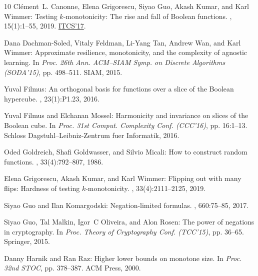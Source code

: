 \documentclass[11pt]{article}
\numberwithin{equation}{section}
\theoremstyle{definition}
\theoremstyle{plain}
\begin{document}
\begin{thebibliography}{10}
{\sc Cl{\'{e}}ment~L. Canonne, Elena Grigorescu, Siyao Guo, Akash Kumar, and
  Karl Wimmer}: Testing $k$-monotonicity: {T}he rise and fall of {B}oolean
  functions.
, 15(1):1--55, 2019.
\newblock \prelim \href{https://doi.org/10.4230/LIPIcs.ITCS.2017.29}{ITCS'17}.

{\sc Dana Dachman-Soled, Vitaly Feldman, Li-Yang Tan, Andrew Wan, and Karl
  Wimmer}: Approximate resilience, monotonicity, and the complexity of agnostic
  learning.
\newblock In {\em Proc. 26th Ann. ACM--SIAM Symp. on Discrete Algorithms
  (SODA'15)}, pp. 498--511. SIAM, 2015.
\newblock [\epfmtdoi{10.1137/1.9781611973730.34}]

{\sc Yuval Filmus}: An orthogonal basis for functions over a slice of the
  {B}oolean hypercube.
, 23(1):P1.23, 2016.
\newblock [\epfmtdoi{10.37236/4567}]

{\sc Yuval Filmus and Elchanan Mossel}: Harmonicity and invariance on slices of
  the {B}oolean cube.
\newblock In {\em Proc. 31st Comput. Complexity Conf. (CCC'16)}, pp. 16:1--13.
  Schloss Dagstuhl--Leibniz-Zentrum fuer Informatik, 2016.

{\sc Oded Goldreich, Shafi Goldwasser, and Silvio Micali}: How to construct
  random functions.
, 33(4):792--807, 1986.
\newblock [\epfmtdoi{10.1145/6490.6503}]

{\sc Elena Grigorescu, Akash Kumar, and Karl Wimmer}: Flipping out with many
  flips: Hardness of testing {$k$}-monotonicity.
, 33(4):2111--2125, 2019.
\newblock [\epfmtdoi{10.1137/18M1217978}]

{\sc Siyao Guo and Ilan Komargodski}: Negation-limited formulas.
, 660:75--85, 2017.

{\sc Siyao Guo, Tal Malkin, Igor~C Oliveira, and Alon Rosen}: The power of
  negations in cryptography.
\newblock In {\em Proc. Theory of Cryptography Conf. (TCC'15)}, pp. 36--65.
  Springer, 2015.
\newblock [\epfmtdoi{10.1007/978-3-662-46494-6\_3}]

{\sc Danny Harnik and Ran Raz}: Higher lower bounds on monotone size.
\newblock In {\em Proc. 32nd STOC}, pp. 378--387. ACM Press, 2000.
\newblock [\epfmtdoi{10.1145/335305.335349}]


\end{thebibliography}
\end{document}
